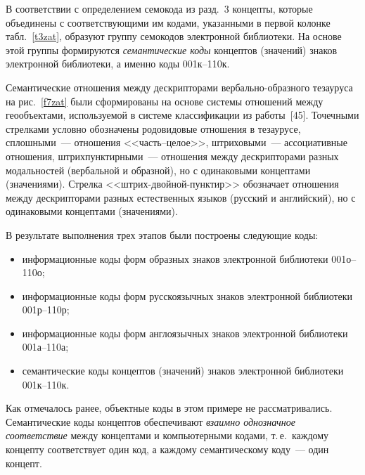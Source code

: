 \begin{multicols}{2}
   В соответствии с определением семокода из разд.~3 концепты, которые объединены с 
соответствующими им кодами, указанными в первой колонке табл.~\ref{t3zat}, образуют 
группу семокодов электронной библиотеки. На основе этой группы формируются 
\textit{семантические коды} концептов (значений) знаков электронной библиотеки, а именно 
коды 001к--110к.
   
   Семантические отношения между дескрипторами вербально-образного тезауруса на 
рис.~\ref{f7zat} были сформированы на основе системы отношений между геообъектами, 
используемой в системе классификации из работы~[45]. Точечными стрелками 
условно обозначены родовидовые отношения в тезаурусе, сплошными~--- отношения 
<<часть--целое>>, штриховыми~--- ассоциативные отношения, штрихпунктирными~--- 
отношения между дескрипторами разных модальностей (вербальной и образной), но с 
одинаковыми концептами (значениями). Стрелка <<штрих-двойной-пунктир>> обозначает 
отношения между дескрипторами разных естественных языков (русский и английский), но с 
одинаковыми концептами (значениями).
   
   В результате выполнения трех этапов были построены следующие коды:
   \begin{itemize}
\item информационные коды форм образных знаков электронной библиотеки 
001о--110о;
\item информационные коды форм русскоязычных знаков электронной библиотеки 
001р--110р;
\item информационные коды форм англоязычных знаков электронной библиотеки 
001а--110а;
\item семантические коды концептов (значений) знаков электронной библиотеки 
001к--110к.
\end{itemize}
   
   Как отмечалось ранее, объектные коды в этом примере не рассматривались. 
Семантические коды концептов обеспечивают \textit{взаимно однозначное соответствие} 
между концептами и компьютерными кодами, т.\,е.\ каждому концепту соответствует один 
код, а каждому семантическому коду~--- один концепт.
   

\end{multicols}
